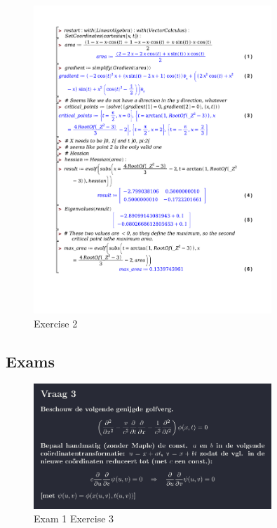 \documentclass[a4paper]{report}
\begin{document}
\begin{figure}[H]
	\centering
	\includegraphics[width=0.8\textwidth]{exercises/wc_4_ex_2.pdf}
	\caption{Exercise 2}
	\label{fig:wc_4_ex_2_maple}
\end{figure}

\subsection{Exams}

\begin{figure}[H]
	\centering
	\includegraphics[width=0.8\textwidth]{assets/exam_1_ex_3.png}
	\caption{Exam 1 Exercise 3}
	\label{fig:exam_1_ex_3}
\end{figure}


\end{document}
